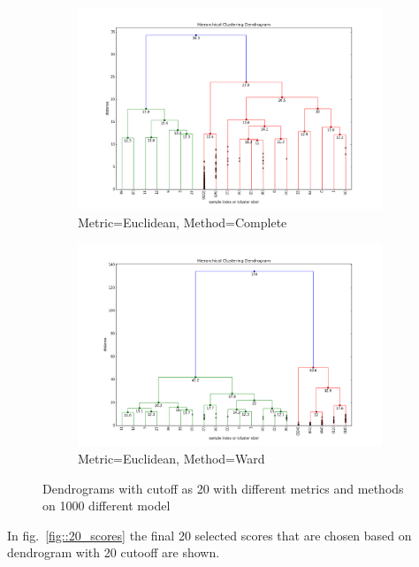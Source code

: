 \begin{figure}[H]
\medskip
\begin{subfigure}{0.48\textwidth}
\includegraphics[width=\linewidth]{figs/Dendrogram/dendrogram-complete}
\caption{Metric=Euclidean, Method=Complete} \label{fig:Dendrogram_all_single_e}
\end{subfigure}\hspace*{\fill}
\begin{subfigure}{0.48\textwidth}
\includegraphics[width=\linewidth]{figs/Dendrogram/dendrogram-ward}
\caption{Metric=Euclidean, Method=Ward} \label{fig:Dendrogram_all_single_f}
\end{subfigure}

\caption{Dendrograms with cutoff as 20 with different metrics and methods on 1000 different model}
\label{fig:Dendrogram_all}
\end{figure}


In fig.~\ref{fig::20_scores} the final 20 selected scores that are chosen based on dendrogram with 20 cutooff are shown.

